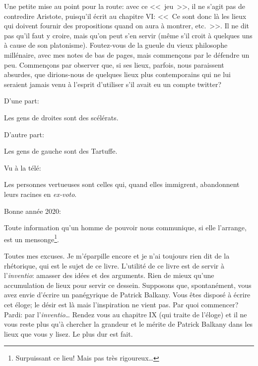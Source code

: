 \bigbreak

Une petite mise au point pour la route: avec ce <<~jeu~>>, il ne s'agit pas de contredire Aristote, puisqu'il écrit au
chapitre VI: <<~Ce sont donc là les lieux qui doivent fournir des propositions quand on aura à montrer, etc.~>>. Il
ne dit pas qu'il faut y croire, mais qu'on peut s'en servir (même s'il croit à quelques uns à cause de son platonisme).
Foutez-vous de la gueule du vieux philosophe millénaire, avec mes notes de bas de pages, mais commençons par le défendre
un peu. Commençons par observer que, si ses lieux, parfois, nous paraissent absurdes, que dirions-nous de quelques lieux
plus contemporains qui ne lui seraient jamais venu à l'esprit d'utiliser s'il avait eu un compte twitter?

D'une part:

\begin{lieu}
	Les gens de droites sont des scélérats.
\end{lieu}

D'autre part:

\begin{lieu}
	Les gens de gauche sont des Tartuffe.
\end{lieu}

Vu à la télé:

\begin{lieu}
	Les personnes vertueuses sont celles qui, quand elles immigrent, abandonnent leurs racines en \emph{ex-voto}.
\end{lieu}

Bonne année 2020:

\begin{lieu}
	Toute information qu'un homme de pouvoir nous communique, si elle l'arrange, est un mensonge\footnote{Surpuissant ce
	lieu! Mais pas très rigoureux\dots}.
\end{lieu}

\bigbreak

Toutes mes excuses. Je m'éparpille encore et je n'ai toujours rien dit de la rhétorique, qui est le sujet de ce livre.
L’utilité de ce livre est de servir à l'\emph{inventio}: amasser des idées et des arguments. Rien de mieux qu'une accumulation
de lieux pour servir ce dessein. Supposons que, spontanément, vous avez envie d'écrire un panégyrique de Patrick Balkany.
Vous êtes disposé à écrire cet éloge; le désir est là mais l'inspiration ne vient pas. Par quoi commencer? Pardi: par
l'\emph{inventio}\dots{} Rendez vous au chapitre IX (qui traite de l'éloge) et il ne vous reste plus qu'à chercher la
grandeur et le mérite de Patrick Balkany dans les lieux que vous y lisez. Le plus dur est fait.

